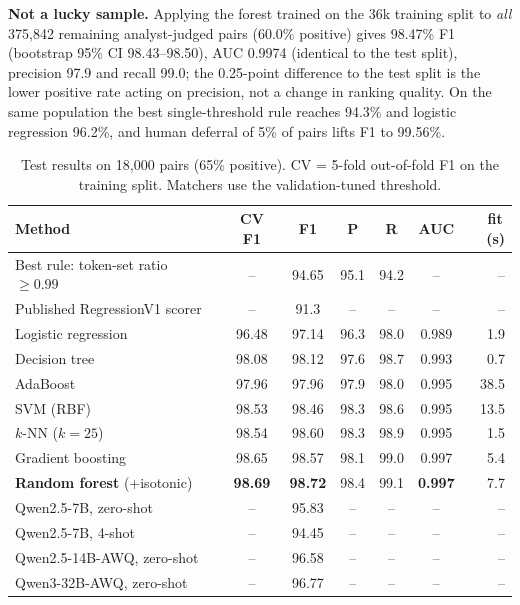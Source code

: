 \documentclass[conference]{IEEEtran}
\begin{document}
\textbf{Not a lucky sample.} Applying the forest trained on the 36k training split to \emph{all} 375{,}842 remaining analyst-judged pairs (60.0\% positive) gives 98.47\% F1 (bootstrap 95\% CI 98.43--98.50), AUC 0.9974 (identical to the test split), precision 97.9 and recall 99.0; the 0.25-point difference to the test split is the lower positive rate acting on precision, not a change in ranking quality. On the same population the best single-threshold rule reaches 94.3\% and logistic regression 96.2\%, and human deferral of 5\% of pairs lifts F1 to 99.56\%.

\begin{table}[t]
\caption{Test results on 18{,}000 pairs (65\% positive). CV = 5-fold out-of-fold F1 on the training split. Matchers use the validation-tuned threshold.}
\label{tab:matchers}
\centering\scriptsize\setlength{\tabcolsep}{3.2pt}
\begin{tabular}{@{}lcccccr@{}}
\toprule
Method & CV F1 & F1 & P & R & AUC & fit\,(s)\\
\midrule
Best rule: token-set ratio $\ge0.99$ & -- & 94.65 & 95.1 & 94.2 & -- & --\\
Published RegressionV1 scorer~\cite{smith2026opensanctions} & -- & 91.3 & -- & -- & -- & --\\
\midrule
Logistic regression & 96.48 & 97.14 & 96.3 & 98.0 & 0.989 & 1.9\\
Decision tree & 98.08 & 98.12 & 97.6 & 98.7 & 0.993 & 0.7\\
AdaBoost & 97.96 & 97.96 & 97.9 & 98.0 & 0.995 & 38.5\\
SVM (RBF) & 98.53 & 98.46 & 98.3 & 98.6 & 0.995 & 13.5\\
$k$-NN ($k{=}25$) & 98.54 & 98.60 & 98.3 & 98.9 & 0.995 & 1.5\\
Gradient boosting & 98.65 & 98.57 & 98.1 & 99.0 & 0.997 & 5.4\\
\textbf{Random forest} (+isotonic) & \textbf{98.69} & \textbf{98.72} & 98.4 & 99.1 & \textbf{0.997} & 7.7\\
\midrule
Qwen2.5-7B, zero-shot & -- & 95.83 & -- & -- & -- & --\\
Qwen2.5-7B, 4-shot & -- & 94.45 & -- & -- & -- & --\\
Qwen2.5-14B-AWQ, zero-shot & -- & 96.58 & -- & -- & -- & --\\
Qwen3-32B-AWQ, zero-shot & -- & 96.77 & -- & -- & -- & --\\
\bottomrule
\end{tabular}
\end{table}
\end{document}
